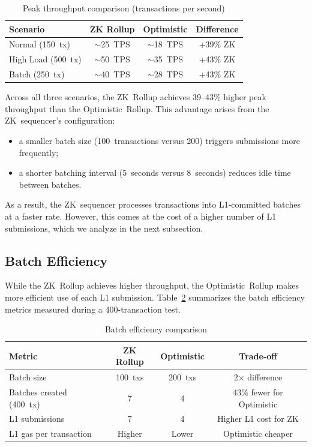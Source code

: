 \documentclass[
]{elteikthesis}[2024/04/26]
\begin{document}
\begin{table}[h]
    \centering
    \begin{tabular}{l|c|c|c}
        \hline
        \textbf{Scenario} & \textbf{ZK Rollup} & \textbf{Optimistic} & \textbf{Difference} \\
        \hline
        Normal (150~tx) & $\sim$25~TPS & $\sim$18~TPS & +39\% ZK \\
        \hline
        High Load (500~tx) & $\sim$50~TPS & $\sim$35~TPS & +43\% ZK \\
        \hline
        Batch (250~tx) & $\sim$40~TPS & $\sim$28~TPS & +43\% ZK \\
        \hline
    \end{tabular}
    \caption{Peak throughput comparison (transactions per second)}
    \label{tab:tps-results}
\end{table}

Across all three scenarios, the ZK~Rollup achieves 39--43\% higher peak throughput than the Optimistic~Rollup. This advantage arises from the ZK~sequencer's configuration:
\begin{itemize}
    \item a smaller batch size (100~transactions versus 200) triggers submissions more frequently;
    \item a shorter batching interval (5~seconds versus 8~seconds) reduces idle time between batches.
\end{itemize}

As a result, the ZK~sequencer processes transactions into L1-committed batches at a faster rate. However, this comes at the cost of a higher number of L1 submissions, which we analyze in the next subsection.

\subsection{Batch Efficiency}

While the ZK~Rollup achieves higher throughput, the Optimistic~Rollup makes more efficient use of each L1 submission. Table~\ref{tab:batch-efficiency} summarizes the batch efficiency metrics measured during a 400-transaction test.

\begin{table}[h]
    \centering
    \begin{tabular}{l|c|c|c}
        \hline
        \textbf{Metric} & \textbf{ZK Rollup} & \textbf{Optimistic} & \textbf{Trade-off} \\
        \hline
        Batch size & 100~txs & 200~txs & 2$\times$ difference \\
        \hline
        Batches created (400~tx) & 7 & 4 & 43\% fewer for Optimistic \\
        \hline
        L1 submissions & 7 & 4 & Higher L1 cost for ZK \\
        \hline
        L1 gas per transaction & Higher & Lower & Optimistic cheaper \\
        \hline
    \end{tabular}
    \caption{Batch efficiency comparison}
    \label{tab:batch-efficiency}
\end{table}
\end{document}
